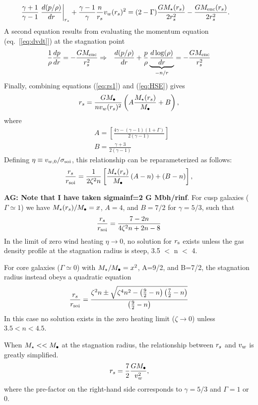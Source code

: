 \begin{align}
&\frac{\gamma+1}{\gamma-1}
\left.\frac{d (p/\rho)}{d r}\right|_{r_s}+ \frac{\gamma-1}{\gamma} \frac{n}{r_s} v_w(r_s)^{2} = (2-\Gamma) \frac{G
  M_{\star}(r_s)}{2 r_s^2} -\frac{G M_{\rm enc}(r_s)}{2 r_s^2}.  \label{eq:rs1}
\end{align}
A second equation results from evaluating the momentum equation (eq.~[\ref{eq:dvdt}]) at the stagnation point
\begin{align}
&\frac{1}{\rho}\frac{d p}{d r}=- \frac{GM_{\rm enc}}{r_s^2} \Rightarrow
&\frac{d (p/\rho)}{d r}+\frac{p}{\rho}
\underbrace{\frac{d\log(\rho)}{dr}}_{-n/r} = -\frac{G M_{\rm enc}}{r_s^2} \label{eq:HSE}
\end{align}
Finally, combining equations (\ref{eq:rs1}) and (\ref{eq:HSE}) gives 
\begin{align}
r_s=\frac{G M_{\bullet}}{n v_w(r_s)^2}\left(A \frac{M_{\star}(r_s)}{M_{\bullet}} +B\right),
\end{align}
where
\begin{align}
&A=\left[\frac{4\gamma-(\gamma-1)(1+\Gamma)}{2 (\gamma-1)}\right]\\
&B=\frac{\gamma+3}{2 (\gamma-1)}
\end{align}
Defining $\eta \equiv v_{w,0}/\sigma_{\rm soi}$, this relationship can be reparameterized as follows:
\begin{align}
  \frac{r_s}{r_{\rm soi}}=\frac{1}{2 \zeta^2 n}\left[
   \frac{M_{\star}(r_s)}{M_{\bullet}}\left(A-n\right)+\left(B-n\right)\right],
\end{align}

{\bf AG: Note that I have taken sigmainf=2 G Mbh/rinf}. For cusp galaxies ($\Gamma\simeq1$) we have $M_{\star}(r_s)/M_{\bullet}=x$, $A=4$, and $B=7/2$ for $\gamma = 5/3$, such that 
\begin{align}
\frac{r_s}{r_{\rm soi}}=\frac{7-2n}{4\zeta^2 n+2n-8}
\end{align}
In the limit of zero wind heating $\eta \rightarrow 0$, no solution for $r_{\rm s}$ exists unless the gas density profile at the stagnation radius is steep, 3.5 $<$ n $<$ 4.  

For core galaxies ($\Gamma \simeq 0$) with $M_{\star}/M_{\bullet}=x^2$, A=9/2,
and B=7/2, the stagnation radius instead obeys a quadratic equation
\begin{align}
\frac{r_s}{r_{\rm soi}}=\frac{\zeta^2 n \pm \sqrt{\zeta^4 n^2 - \left(\frac{9}{2}-n\right) \left(\frac{7}{2}-n\right)}}{\left(\frac{9}{2}-n\right)}
\label{eq:rstag}
\end{align}
In this case no solution exists in the zero heating limit ($\zeta \rightarrow 0$) unless $3.5<n<4.5$.

When $M_{\star} << M_{\bullet}$ at the stagnation radius, the relationship between $r_s$ and $v_w$ is greatly simplified. 
\begin{align}
r_s=\frac{7}{2}\frac{G M_{\bullet}}{v_w^2},
\end{align}
where the pre-factor on the right-hand side corresponds to
$\gamma=5/3$ and $\Gamma=1$ or 0.  



